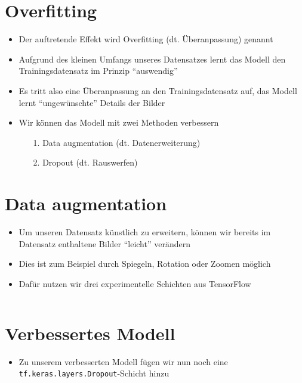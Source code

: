\documentclass[t]{beamer}
\newcommand\pycode[1]{\inputminted[frame=lines, framesep=2mm, fontsize=\normalsize]{python}{#1}}
\begin{document}
\section{Overfitting}
\begin{frame}
    \begin{itemize}
        \item Der auftretende Effekt wird Overfitting (dt. Überanpassung) genannt
        \item Aufgrund des kleinen Umfangs unseres Datensatzes lernt das Modell den Trainingsdatensatz im Prinzip \enquote{auswendig}
        \item Es tritt also eine Überanpassung an den Trainingsdatensatz auf, das Modell lernt \enquote{ungewünschte} Details der Bilder
        \newline
        \item Wir können das Modell mit zwei Methoden verbessern
        \begin{itemize}
            \item[1.] Data augmentation (dt. Datenerweiterung)
            \item[2.] Dropout (dt. Rauswerfen)
        \end{itemize}
    \end{itemize}
\end{frame}

\section{Data augmentation}
\begin{frame}
    \begin{itemize}
        \item Um unseren Datensatz künstlich zu erweitern, können wir bereits im Datensatz enthaltene Bilder \enquote{leicht} verändern
        \item Dies ist zum Beispiel durch Spiegeln, Rotation oder Zoomen möglich
        \newline
        \item Dafür nutzen wir drei experimentelle Schichten aus TensorFlow
        \pycode{./code-snippets/data-aug.py}
    \end{itemize}
\end{frame}

\section{Verbessertes Modell}
\begin{frame}
    \begin{itemize}
        \item Zu unserem verbesserten Modell fügen wir nun noch eine \texttt{tf.keras.layers.Dropout}-Schicht hinzu
        \pycode{./code-snippets/improved-model.py}
    \end{itemize}
\end{frame}
\end{document}
